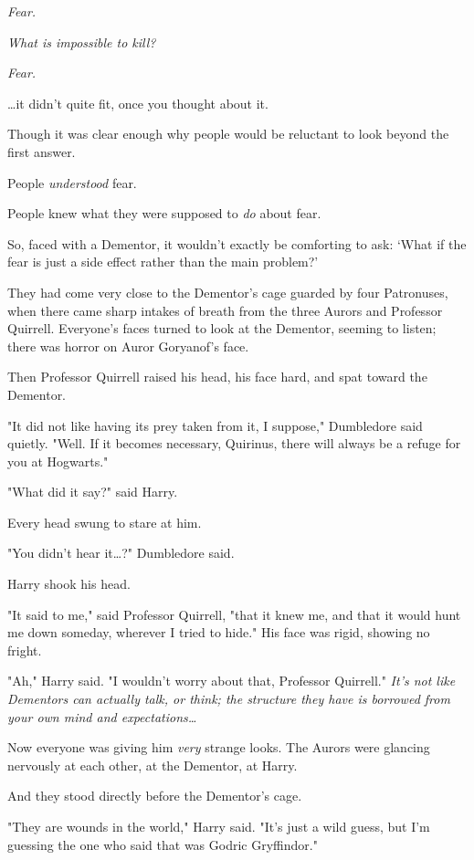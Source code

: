 \emph{Fear.}

\emph{What is impossible to kill?}

\emph{Fear.}

{\ldots}it didn't quite fit, once you thought about it.

Though it was clear enough why people would be reluctant to look beyond the 
first answer.

People \emph{understood} fear.

People knew what they were supposed to \emph{do} about fear.

So, faced with a Dementor, it wouldn't exactly be comforting to ask: `What if 
the fear is just a side effect rather than the main problem?'

They had come very close to the Dementor's cage guarded by four Patronuses, 
when there came sharp intakes of breath from the three Aurors and Professor 
Quirrell. Everyone's faces turned to look at the Dementor, seeming to listen; 
there was horror on Auror Goryanof's face.

Then Professor Quirrell raised his head, his face hard, and spat toward the 
Dementor.

"It did not like having its prey taken from it, I suppose," Dumbledore said 
quietly. "Well. If it becomes necessary, Quirinus, there will always be a 
refuge for you at Hogwarts."

"What did it say?" said Harry.

Every head swung to stare at him.

"You didn't hear it{\ldots}?" Dumbledore said.

Harry shook his head.

"It said to me," said Professor Quirrell, "that it knew me, and that it would 
hunt me down someday, wherever I tried to hide." His face was rigid, showing no 
fright.

"Ah," Harry said. "I wouldn't worry about that, Professor Quirrell." \emph{It's 
not like Dementors can actually talk, or think; the structure they have is 
borrowed from your own mind and expectations{\ldots}}

Now everyone was giving him \emph{very} strange looks. The Aurors were glancing 
nervously at each other, at the Dementor, at Harry.

And they stood directly before the Dementor's cage.

"They are wounds in the world," Harry said. "It's just a wild guess, but I'm 
guessing the one who said that was Godric Gryffindor."

